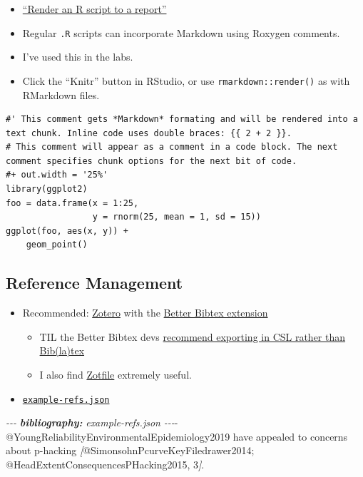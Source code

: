 \documentclass[
]{article}
\newenvironment{Shaded}{\begin{snugshade}}{\end{snugshade}}
\newcommand{\AnnotationTok}[1]{\textcolor[rgb]{0.56,0.35,0.01}{\textbf{\textit{#1}}}}
\newcommand{\CommentTok}[1]{\textcolor[rgb]{0.56,0.35,0.01}{\textit{#1}}}
\newcommand{\NormalTok}[1]{#1}
\newcommand{\OtherTok}[1]{\textcolor[rgb]{0.56,0.35,0.01}{#1}}
\providecommand{\tightlist}{%
  \setlength{\itemsep}{0pt}\setlength{\parskip}{0pt}}
\begin{document}
\begin{itemize}
\item
  \href{https://bookdown.org/yihui/rmarkdown-cookbook/spin.html}{``Render an R script to a report''}
\item
  Regular \texttt{.R} scripts can incorporate Markdown using Roxygen comments.\\
\item
  I've used this in the labs.\\
\item
  Click the ``Knitr'' button in RStudio, or use \texttt{rmarkdown::render()} as with RMarkdown files.
\end{itemize}

\begin{verbatim}
#' This comment gets *Markdown* formating and will be rendered into a text chunk. Inline code uses double braces: {{ 2 + 2 }}. 
# This comment will appear as a comment in a code block. The next comment specifies chunk options for the next bit of code. 
#+ out.width = '25%'
library(ggplot2)
foo = data.frame(x = 1:25, 
                 y = rnorm(25, mean = 1, sd = 15))
ggplot(foo, aes(x, y)) +
    geom_point()
\end{verbatim}

\hypertarget{reference-management}{%
\subsection{Reference Management}\label{reference-management}}

\begin{itemize}
\tightlist
\item
  Recommended: \href{https://www.zotero.org/}{Zotero} with the \href{https://retorque.re/zotero-better-bibtex/}{Better Bibtex extension}

  \begin{itemize}
  \tightlist
  \item
    TIL the Better Bibtex devs \href{https://retorque.re/zotero-better-bibtex/exporting/pandoc/}{recommend exporting in CSL rather than Bib(la)tex}
  \item
    I also find \href{http://zotfile.com/}{Zotfile} extremely useful.
  \end{itemize}
\item
  \href{https://drive.google.com/file/d/1MuVaaSYVPBjEkYshbjG3j0YrhOmhzKGL/view?usp=sharing}{\texttt{example-refs.json}}
\end{itemize}

\begin{Shaded}
\begin{Highlighting}[]
\CommentTok{{-}{-}{-}}
\AnnotationTok{bibliography:}\CommentTok{ example{-}refs.json}
\CommentTok{{-}{-}{-}}\NormalTok{{-}}
\NormalTok{@YoungReliabilityEnvironmentalEpidemiology2019 have appealed to concerns about p{-}hacking }\CommentTok{[}\OtherTok{@SimonsohnPcurveKeyFiledrawer2014; @HeadExtentConsequencesPHacking2015, 3}\CommentTok{]}\NormalTok{. }
\end{Highlighting}
\end{Shaded}
\end{document}
